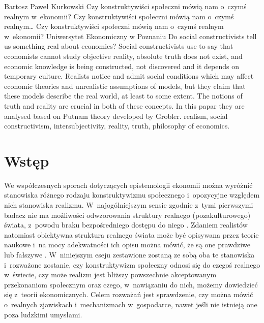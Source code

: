 \begin{artplenv}{Bartosz Paweł Kurkowski}
	{Czy konstruktywiści społeczni mówią nam o~czymś realnym w~ekonomii?}
	{Czy konstruktywiści społeczni mówią nam o~czymś realnym\ldots}
	{Czy konstruktywiści społeczni mówią nam o~czymś realnym\\w~ekonomii?}
	{Uniwersytet Ekonomiczny w Poznaniu}
	{Do social constructivists tell us something real about economics?}
	{Social constructivists use to say that economists cannot study objective reality, absolute truth does not exist, and economic
		knowledge is being constructed, not discovered and it depends on temporary culture. Realists notice and admit social
		conditions which may affect economic theories and unrealistic assumptions of models, but they claim that these models
		describe the real world, at least to some extent. The notions of truth and reality are crucial in both of these concepts. In this papar they are analysed based on Putnam theory developed by Grobler.}
	{realism, social constructivism, intersubjectivity, reality, truth, philosophy of economics.}



\section*{Wstęp}

\lettrine[loversize=0.13,lines=2,lraise=-0.05,nindent=0em,findent=0.2pt]%
{W}{}e współczesnych sporach dotyczących epistemologii ekonomii można wyróżnić stanowiska różnego rodzaju konstruktywizmu
społecznego i~opozycyjne względem nich stanowiska realizmu. W~najogólniejszym sensie zgodnie z~tymi pierwszymi badacz
nie ma możliwości odwzorowania struktury realnego (pozakulturowego) świata, z~powodu braku bezpośredniego dostępu do
niego
\parencite[s.~30]{zboron_teorie_2009}.
Zdaniem realistów natomiast obiektywna struktura realnego świata
może być opisywana przez teorie naukowe i~na mocy adekwatności ich opisu można mówić, że są one prawdziwe lub fałszywe
\parencite[s.~74]{kincaid_realistic_2009}.
W~niniejszym eseju zestawione zostaną ze sobą oba te stanowiska i~rozważone
zostanie, czy konstruktywizm społeczny odnosi się do czegoś realnego w~świecie, czy może realizm jest bliższy
powszechnie akceptowanym przekonaniom społecznym oraz czego, w~nawiązaniu do nich, możemy dowiedzieć się z~teorii
ekonomicznych. Celem rozważań jest sprawdzenie, czy można mówić o~realnych zjawiskach i~mechanizmach w~gospodarce,
nawet jeśli nie istnieją one poza ludzkimi umysłami.


\end{artplenv}
